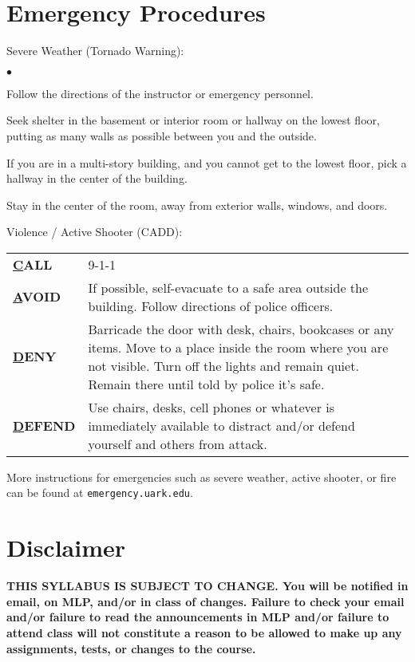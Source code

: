 \documentclass[margin,line,pifont,palatino,courier]{res}
\newenvironment{list2}{
  \begin{list}{$\bullet$}{%
      \setlength{\itemsep}{0in}
      \setlength{\parsep}{0in} \setlength{\parskip}{0in}
      \setlength{\topsep}{0in} \setlength{\partopsep}{0in}
      \setlength{\leftmargin}{0.2in}}}{\end{list}}
\begin{document}
\begin{resume}
\section{\sc Emergency Procedures} Severe Weather (Tornado Warning):
\begin{list2}
\item Follow the directions of the instructor or emergency personnel.
\item Seek shelter in the basement or interior room or hallway on the lowest floor, putting as many walls as possible between you and the outside.
\item If you are in a multi-story building, and you cannot get to the lowest floor, pick a hallway in the center of the building.
\item Stay in the center of the room, away from exterior walls, windows, and doors.
\end{list2}

Violence / Active Shooter (CADD):

\vspace{-.25in}
\begin{center}
\begin{tabular}{@{}lp{}}
{\bf \underline CALL} & 9-1-1 \\
{\bf \underline AVOID} & If possible, self-evacuate to a safe area outside the building.  Follow directions of police officers. \\
{\bf \underline DENY} & Barricade the door with desk, chairs, bookcases or any items.  Move to a place inside the room where you are not visible.  Turn off the lights and remain quiet.  Remain there until told by police it's safe. \\
{\bf \underline DEFEND} & Use chairs, desks, cell phones or whatever is immediately available to distract and/or defend yourself and others from attack. \\
\end{tabular}
\end{center}

\vspace{-.2in}
More instructions for emergencies such as severe weather, active shooter, or fire can be found at \verb+emergency.uark.edu+.   

\section{\sc Disclaimer} {\bf THIS SYLLABUS IS SUBJECT TO CHANGE. You will be notified in email, on MLP, and/or in class of changes. Failure to check your email and/or failure to read the announcements in MLP and/or failure to attend class will not constitute a reason to be allowed to make up any assignments, tests, or changes to the course.}

\end{resume}
\end{document}
